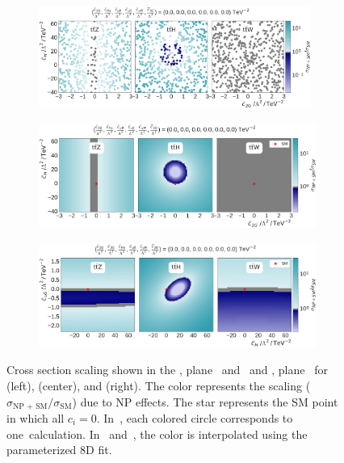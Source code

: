 \begin{figure}
  \begin{subfigure}{\linewidth}
    \includegraphics[width=0.98\textwidth]{figures/thirteen-TeV/NP/c2G_cH_mg}
    \caption{}
    \label{sfig:c2G-cH-mg}
  \end{subfigure}
  \begin{subfigure}{\linewidth}
    \includegraphics[width=\textwidth]{figures/thirteen-TeV/NP/c2G_cH}
    \caption{}
    \label{sfig:c2G-cH-fit}
  \end{subfigure}
  \begin{subfigure}{\linewidth}
    \includegraphics[width=\textwidth]{figures/thirteen-TeV/scaling-frozen/cH_cuG}
    \caption{}
    \label{sfig:cH-cuG-fit}
  \end{subfigure}
  \vspace{-1cm}
  \caption[Signal scaling as a function of Wilson coefficient pairs]{Cross section scaling shown in the \cH, \ctwoG plane~ and~ and \cH, \cuG plane~ for \ttZ (left), \ttH (center), and \ttW (right). The color represents the scaling ($\sigma_\text{NP + SM} / \sigma_\text{SM}$) due to NP effects. The star represents the SM point in which all $c_i=0$. In~, each colored circle corresponds to one~\madgraph calculation. In~ and~, the color is interpolated using the parameterized 8D fit.}
  \label{fig:mg-vs-fit}
\end{figure}


